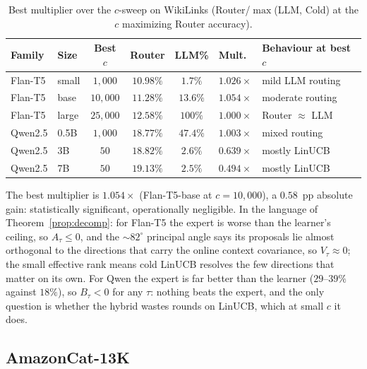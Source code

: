 \documentclass{article}
\theoremstyle{definition}
\theoremstyle{remark}
\theoremstyle{remark}
\begin{document}
\begin{table}[h]
\centering
\caption{Best multiplier over the $c$-sweep on WikiLinks
(Router/$\max$(LLM, Cold) at the $c$ maximizing Router accuracy).}
\label{tab:wiki-csweep}
\small
\begin{tabular}{@{}llccccl@{}}
\toprule
Family & Size & Best $c$ & Router & LLM\% & Mult.\ & Behaviour at best $c$ \\
\midrule
Flan-T5 & small & $1{,}000$ & $10.98\%$ & $1.7\%$ & $1.026\times$ & mild LLM routing \\
Flan-T5 & base  & $10{,}000$ & $11.28\%$ & $13.6\%$ & $1.054\times$ & moderate routing \\
Flan-T5 & large & $25{,}000$ & $12.58\%$ & $100\%$ & $1.000\times$ & Router $\approx$ LLM \\
\midrule
Qwen2.5 & 0.5B  & $1{,}000$ & $18.77\%$ & $47.4\%$ & $1.003\times$ & mixed routing \\
Qwen2.5 & 3B    & $50$ & $18.82\%$ & $2.6\%$ & $0.639\times$ & mostly LinUCB \\
Qwen2.5 & 7B    & $50$ & $19.13\%$ & $2.5\%$ & $0.494\times$ & mostly LinUCB \\
\bottomrule
\end{tabular}
\end{table}

The best multiplier is $1.054\times$ (Flan-T5-base at $c=10{,}000$), a
$0.58$~pp absolute gain: statistically significant, operationally negligible.
In the language of Theorem~\ref{prop:decomp}: for Flan-T5 the expert is
worse than the learner's ceiling, so $A_\tau\le0$, and the $\sim82^\circ$
principal angle says its proposals lie almost orthogonal to the directions
that carry the online context covariance, so $V_\tau\approx0$; the small
effective rank means cold LinUCB resolves the few directions that matter on
its own. For Qwen the expert is far better than the learner ($29$--$39\%$
against $18\%$), so $B_\tau<0$ for any $\tau$: nothing beats the expert, and
the only question is whether the hybrid wastes rounds on LinUCB, which at
small $c$ it does.

\subsection{AmazonCat-13K}
\label{sec:amazon}
\end{document}
